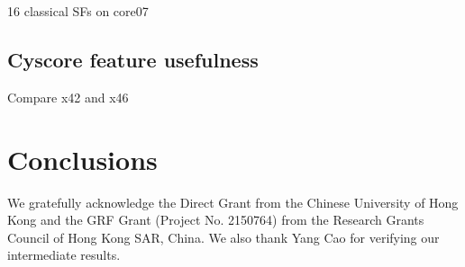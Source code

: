 \documentclass[journal=jacsat,manuscript=article]{achemso}
\begin{document}
16 classical SFs on core07 \cite{1313}

\subsection{Cyscore feature usefulness}

Compare x42 and x46

\section{Conclusions}



\begin{acknowledgement}

We gratefully acknowledge the Direct Grant from the Chinese University of Hong Kong and the GRF Grant (Project No. 2150764) from the Research Grants Council of Hong Kong SAR, China. We also thank Yang Cao for verifying our intermediate results.

\end{acknowledgement}

\begin{suppinfo}



\end{suppinfo}


\end{document}
